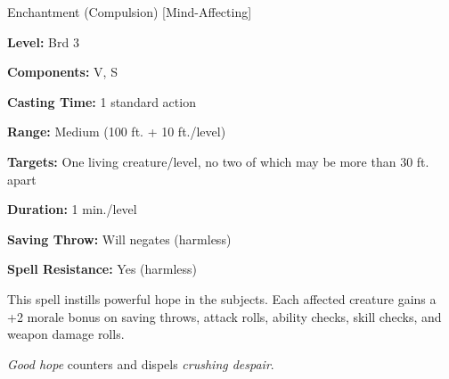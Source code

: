 
Enchantment (Compulsion) [Mind-Affecting]

\textbf{Level:} Brd 3

\textbf{Components:} V, S

\textbf{Casting Time:} 1 standard action

\textbf{Range:} Medium (100 ft. + 10 ft./level)

\textbf{Targets:} One living creature/level, no two of which may be more than 30 
ft. apart

\textbf{Duration:} 1 min./level

\textbf{Saving Throw:} Will negates (harmless)

\textbf{Spell Resistance:} Yes (harmless)

This spell instills powerful hope in the subjects. Each affected creature gains 
a +2 morale bonus on saving throws, attack rolls, ability checks, skill checks, 
and weapon damage rolls.

\textit{Good hope} counters and dispels \textit{crushing despair}.

